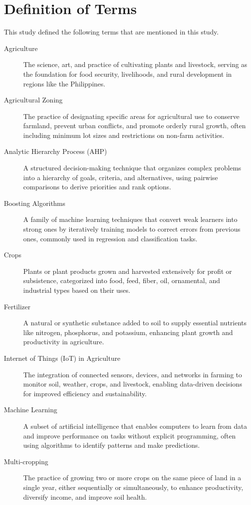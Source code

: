 {\section{Definition of Terms}

This study defined the following terms that are mentioned in this study.
	\begin{description}
	\item[Agriculture] 
	The science, art, and practice of cultivating plants and livestock, serving as the foundation for food security, livelihoods, and rural development in regions like the Philippines.
	\item[Agricultural Zoning] 
	The practice of designating specific areas for agricultural use to conserve farmland, prevent urban conflicts, and promote orderly rural growth, often including minimum lot sizes and restrictions on non-farm activities.
	\item[Analytic Hierarchy Process (AHP)] 
	A structured decision-making technique that organizes complex problems into a hierarchy of goals, criteria, and alternatives, using pairwise comparisons to derive priorities and rank options.
	\item[Boosting Algorithms] 
	A family of machine learning techniques that convert weak learners into strong ones by iteratively training models to correct errors from previous ones, commonly used in regression and classification tasks.
	\item[Crops] 
	Plants or plant products grown and harvested extensively for profit or subsistence, categorized into food, feed, fiber, oil, ornamental, and industrial types based on their uses.
	\item[Fertilizer] 
	A natural or synthetic substance added to soil to supply essential nutrients like nitrogen, phosphorus, and potassium, enhancing plant growth and productivity in agriculture.
	\item[Internet of Things (IoT) in Agriculture] 
	The integration of connected sensors, devices, and networks in farming to monitor soil, weather, crops, and livestock, enabling data-driven decisions for improved efficiency and sustainability.
	\item[Machine Learning] 
	A subset of artificial intelligence that enables computers to learn from data and improve performance on tasks without explicit programming, often using algorithms to identify patterns and make predictions.
	\item[Multi-cropping]
	The practice of growing two or more crops on the same piece of land in a single year, either sequentially or simultaneously, to enhance productivity, diversify income, and improve soil health.

\end{description}}
